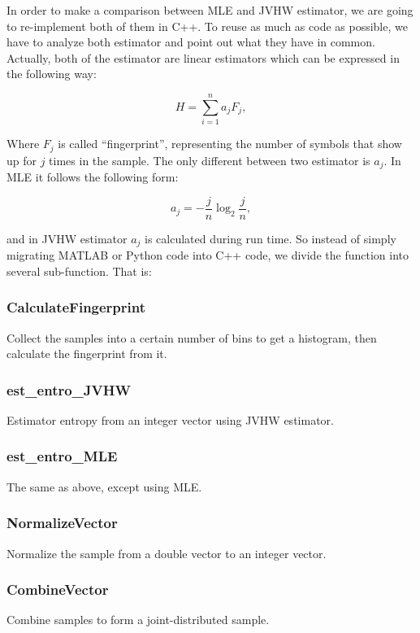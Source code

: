 \documentclass{IEEEtran}
\begin{document}
  In order to make a comparison between MLE and JVHW estimator, we are going to re-implement both of them in C++. To reuse as much as code as possible, we have to analyze both estimator and point out what they have in common. Actually, both of the estimator are linear estimators which can be expressed in the following way:

  \begin{equation}
    H = \sum_{i = 1}^n{a_jF_j},
  \end{equation}

  Where $F_j$ is called ``fingerprint'', representing the number of symbols that show up for $j$ times in the sample. The only different between two estimator is $a_j$. In MLE it follows the following form:

  \begin{equation}
    a_j = -\frac{j}{n}\log_2{\frac{j}{n}},
  \end{equation}

  and in JVHW estimator $a_j$ is calculated during run time. So instead of simply migrating MATLAB or Python code into C++ code, we divide the function into several sub-function. That is:

  \subsubsection{CalculateFingerprint}
  Collect the samples into a certain number of bins to get a histogram, then calculate the fingerprint from it.

  \subsubsection{est\_entro\_JVHW}
  Estimator entropy from an integer vector using JVHW estimator.

  \subsubsection{est\_entro\_MLE}
  The same as above, except using MLE.

  \subsubsection{NormalizeVector}
  Normalize the sample from a double vector to an integer vector.

  \subsubsection{CombineVector}
  Combine samples to form a joint-distributed sample.
\end{document}
